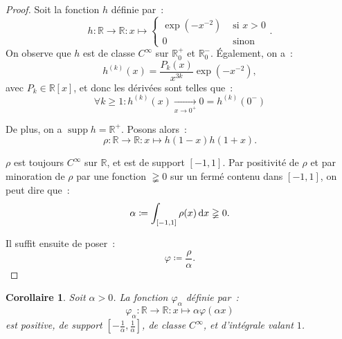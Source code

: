 \documentclass{report}
\newtheorem{cor}[thm]{Corollaire}
\theoremstyle{definition}
\theoremstyle{remark}
\numberwithin{equation}{section}
\newcommand{\R}{\mathbb R}
\newcommand{\Rp}{\R^{+}}
\newcommand{\Rm}{\R^{-}}
\DeclareMathOperator{\supp}{supp}
\begin{document}
			\begin{proof} Soit la fonction $h$ définie par~:
			\begin{equation}
				h : \R \to \R : x \mapsto \begin{cases}\exp\left(-x^{-2}\right) &\text{ si } x > 0 \\0 &\text{ sinon }\end{cases}.
			\end{equation}
			On observe que $h$ est de classe $C^\infty$ sur $\Rp_0$ et $\Rm_0$. Également, on a~:
			\begin{equation}
				h^{(k)}(x) = \frac {P_k(x)}{x^{3k}}\exp(-x^{-2}),
			\end{equation}
			avec $P_k \in \R[x]$, et donc les dérivées sont telles que~:
			\begin{equation}
				\forall k \geq 1 : h^{(k)}(x) \xrightarrow[x \to 0^+]{} 0 = h^{(k)}(0^-)
			\end{equation}

			De plus, on a $\supp h = \Rp$. Posons alors~:
			\begin{equation}
				\rho : \R \to \R : x \mapsto h(1-x)h(1+x).
			\end{equation}

			$\rho$ est toujours $C^\infty$ sur $\R$, et est de support $[-1, 1]$. Par positivité de $\rho$ et par minoration de $\rho$ par une fonction $\gneqq 0$
			sur un fermé contenu dans $[-1, 1]$, on peut dire que~:
			\begin{equation}
				\alpha \coloneqq \int_{[-1, 1]}\rho(x)\dif x \gneqq 0.
			\end{equation}

			Il suffit ensuite de poser~:
			\begin{equation}
				\varphi \coloneqq \frac \rho\alpha.
			\end{equation}
			\end{proof}

			\begin{cor}\label{cor:varphi_k}Soit $\alpha > 0$. La fonction $\varphi_\alpha$ définie par~:
			\begin{equation}
				\varphi_\alpha : \R \to \R : x \mapsto \alpha\varphi(\alpha x)
			\end{equation}
			est positive, de support $\left[-\frac 1\alpha, \frac 1\alpha\right]$, de classe $C^\infty$, et d'intégrale valant $1$.
			\end{cor}
\end{document}
